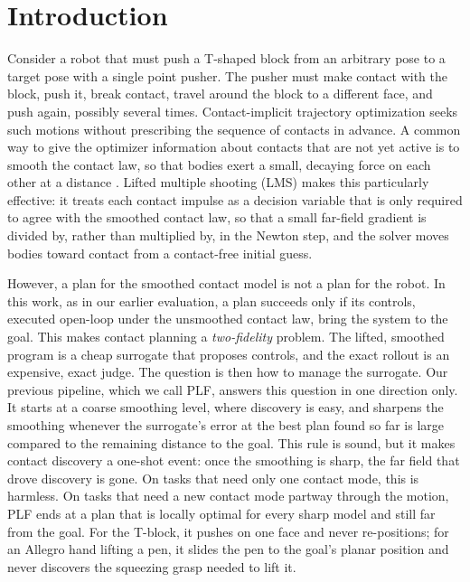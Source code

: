 \documentclass[11pt]{article}
\theoremstyle{remark}
\begin{document}
\section{Introduction}

Consider a robot that must push a T-shaped block from an arbitrary pose to a target pose with a single point pusher. The pusher must make contact with the block, push it, break contact, travel around the block to a different face, and push again, possibly several times. Contact-implicit trajectory optimization \cite{posa2014direct,mordatch2012discovery} seeks such motions without prescribing the sequence of contacts in advance. A common way to give the optimizer information about contacts that are not yet active is to smooth the contact law, so that bodies exert a small, decaying force on each other at a distance \cite{pang2023global,suh2022bundled}. Lifted multiple shooting (LMS) \cite{li2027lifted} makes this particularly effective: it treats each contact impulse as a decision variable that is only required to agree with the smoothed contact law, so that a small far-field gradient is divided by, rather than multiplied by, in the Newton step, and the solver moves bodies toward contact from a contact-free initial guess.

However, a plan for the smoothed contact model is not a plan for the robot. In this work, as in our earlier evaluation, a plan succeeds only if its controls, executed open-loop under the unsmoothed contact law, bring the system to the goal. This makes contact planning a \emph{two-fidelity} problem. The lifted, smoothed program is a cheap surrogate that proposes controls, and the exact rollout is an expensive, exact judge. The question is then how to manage the surrogate. Our previous pipeline, which we call PLF, answers this question in one direction only. It starts at a coarse smoothing level, where discovery is easy, and sharpens the smoothing whenever the surrogate's error at the best plan found so far is large compared to the remaining distance to the goal. This rule is sound, but it makes contact discovery a one-shot event: once the smoothing is sharp, the far field that drove discovery is gone. On tasks that need only one contact mode, this is harmless. On tasks that need a new contact mode partway through the motion, PLF ends at a plan that is locally optimal for every sharp model and still far from the goal. For the T-block, it pushes on one face and never re-positions; for an Allegro hand lifting a pen, it slides the pen to the goal's planar position and never discovers the squeezing grasp needed to lift it.
\end{document}
